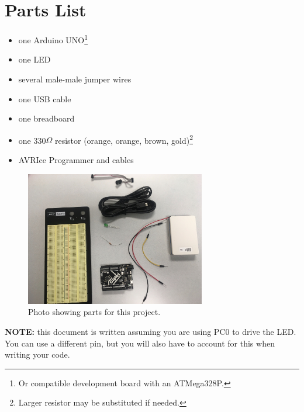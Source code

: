 \documentclass{article}
\begin{document}
\section{Parts List}

\begin{multicols}{2}

\begin{itemize}

\item one Arduino UNO\footnote{Or compatible development board with an ATMega328P.}

\item one LED

\item several male-male jumper wires

\item one USB cable

\item one breadboard

\item one 330$\Omega$ resistor (orange, orange, brown, gold)\footnote{Larger
	resistor may be substituted if needed.}

\item AVRIce Programmer and cables

\end{itemize}

\end{multicols}

\begin{figure}[H]
	\centering

	\includegraphics[max width = 0.7\textwidth]{parts.jpg}

	\caption{Photo showing parts for this project.}

\end{figure}

\textbf{NOTE:} this document is written assuming you are using PC0 to drive the
LED. You can use a different pin, but you will also have to account for this
when writing your code.
\end{document}
